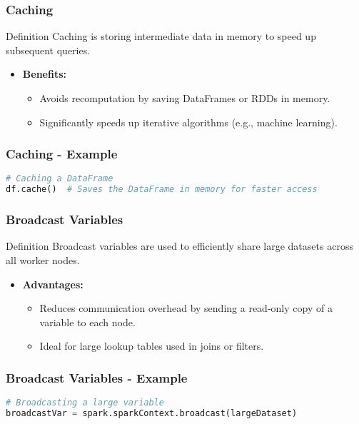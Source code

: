 \documentclass[aspectratio=169]{beamer}
\begin{document}
\begin{frame}
    \frametitle{Caching}
    \begin{block}{Definition}
        Caching is storing intermediate data in memory to speed up subsequent queries.
    \end{block}
    \begin{itemize}
        \item \textbf{Benefits:}
            \begin{itemize}
                \item Avoids recomputation by saving DataFrames or RDDs in memory.
                \item Significantly speeds up iterative algorithms (e.g., machine learning).
            \end{itemize}
    \end{itemize}
\end{frame}

\begin{frame}[fragile]
    \frametitle{Caching - Example}
    \begin{lstlisting}[language=Python]
# Caching a DataFrame
df.cache()  # Saves the DataFrame in memory for faster access
    \end{lstlisting}
\end{frame}

\begin{frame}
    \frametitle{Broadcast Variables}
    \begin{block}{Definition}
        Broadcast variables are used to efficiently share large datasets across all worker nodes.
    \end{block}
    \begin{itemize}
        \item \textbf{Advantages:}
            \begin{itemize}
                \item Reduces communication overhead by sending a read-only copy of a variable to each node.
                \item Ideal for large lookup tables used in joins or filters.
            \end{itemize}
    \end{itemize}
\end{frame}

\begin{frame}[fragile]
    \frametitle{Broadcast Variables - Example}
    \begin{lstlisting}[language=Python]
# Broadcasting a large variable
broadcastVar = spark.sparkContext.broadcast(largeDataset)
    \end{lstlisting}
\end{frame}
\end{document}
